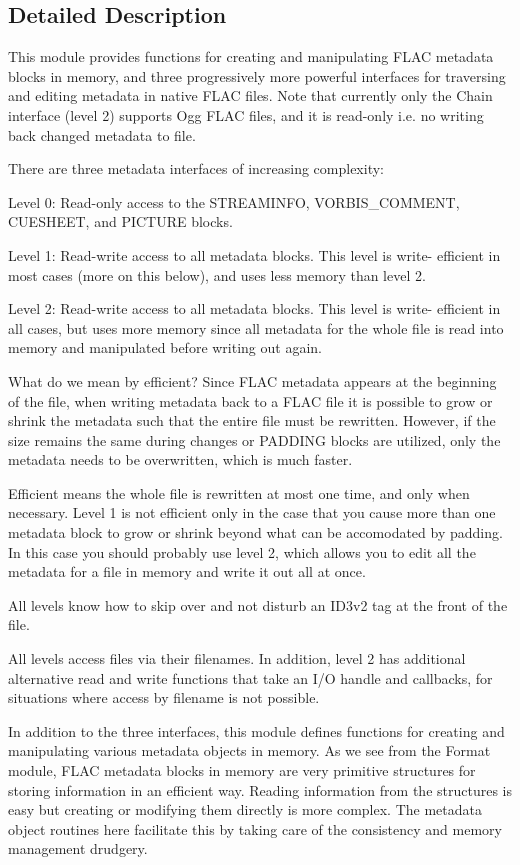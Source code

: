 \subsection{Detailed Description}
This module provides functions for creating and manipulating F\+L\+AC metadata blocks in memory, and three progressively more powerful interfaces for traversing and editing metadata in native F\+L\+AC files. Note that currently only the Chain interface (level 2) supports Ogg F\+L\+AC files, and it is read-\/only i.\+e. no writing back changed metadata to file. 

There are three metadata interfaces of increasing complexity\+:

Level 0\+: Read-\/only access to the S\+T\+R\+E\+A\+M\+I\+N\+FO, V\+O\+R\+B\+I\+S\+\_\+\+C\+O\+M\+M\+E\+NT, C\+U\+E\+S\+H\+E\+ET, and P\+I\+C\+T\+U\+RE blocks.

Level 1\+: Read-\/write access to all metadata blocks. This level is write-\/ efficient in most cases (more on this below), and uses less memory than level 2.

Level 2\+: Read-\/write access to all metadata blocks. This level is write-\/ efficient in all cases, but uses more memory since all metadata for the whole file is read into memory and manipulated before writing out again.

What do we mean by efficient? Since F\+L\+AC metadata appears at the beginning of the file, when writing metadata back to a F\+L\+AC file it is possible to grow or shrink the metadata such that the entire file must be rewritten. However, if the size remains the same during changes or P\+A\+D\+D\+I\+NG blocks are utilized, only the metadata needs to be overwritten, which is much faster.

Efficient means the whole file is rewritten at most one time, and only when necessary. Level 1 is not efficient only in the case that you cause more than one metadata block to grow or shrink beyond what can be accomodated by padding. In this case you should probably use level 2, which allows you to edit all the metadata for a file in memory and write it out all at once.

All levels know how to skip over and not disturb an I\+D3v2 tag at the front of the file.

All levels access files via their filenames. In addition, level 2 has additional alternative read and write functions that take an I/O handle and callbacks, for situations where access by filename is not possible.

In addition to the three interfaces, this module defines functions for creating and manipulating various metadata objects in memory. As we see from the Format module, F\+L\+AC metadata blocks in memory are very primitive structures for storing information in an efficient way. Reading information from the structures is easy but creating or modifying them directly is more complex. The metadata object routines here facilitate this by taking care of the consistency and memory management drudgery.

